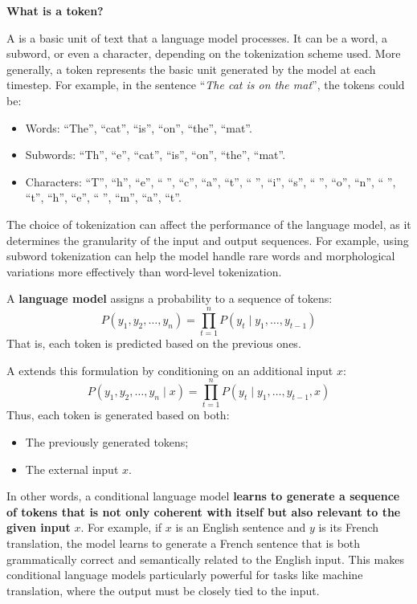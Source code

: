 \begin{flushleft}
    \textcolor{Green3}{ \textbf{What is a token?}}
\end{flushleft}
A  is a basic unit of text that a language model processes. It can be a word, a subword, or even a character, depending on the tokenization scheme used. More generally, a token represents the basic unit generated by the model at each timestep. For example, in the sentence ``\emph{The cat is on the mat}'', the tokens could be:
\begin{itemize}
    \item Words: ``The'', ``cat'', ``is'', ``on'', ``the'', ``mat''.
    \item Subwords: ``Th'', ``e'', ``cat'', ``is'', ``on'', ``the'', ``mat''.
    \item Characters: ``T'', ``h'', ``e'', `` '', ``c'', ``a'', ``t'', `` '', ``i'', ``s'', `` '', ``o'', ``n'', `` '', ``t'', ``h'', ``e'', `` '', ``m'', ``a'', ``t''.
\end{itemize}
The choice of tokenization can affect the performance of the language model, as it determines the granularity of the input and output sequences. For example, using subword tokenization can help the model handle rare words and morphological variations more effectively than word-level tokenization.

\highspace
\begin{definitionbox}
    A \textbf{language model} assigns a probability to a sequence of tokens:
    \begin{equation*}
        P\left(y_1, y_2, \dots, y_n\right)
        =
        \prod_{t=1}^{n}
        P\left(y_t \mid y_1, \dots, y_{t-1}\right)
    \end{equation*}
    That is, each token is predicted based on the previous ones.

    \highspace
    A  extends this formulation by conditioning on an additional input $x$:
    \begin{equation}\label{eq:conditional-language-model}
        P\left(y_1, y_2, \dots, y_n \mid x\right)
        =
        \prod_{t=1}^{n}
        P\left(y_t \mid y_1, \dots, y_{t-1}, x\right)
    \end{equation}
    Thus, each token is generated based on both:
    \begin{itemize}
        \item The previously generated tokens;
        \item The external input $x$.
    \end{itemize}
    In other words, a conditional language model \textbf{learns to generate a sequence of tokens that is not only coherent with itself but also relevant to the given input} $x$. For example, if $x$ is an English sentence and $y$ is its French translation, the model learns to generate a French sentence that is both grammatically correct and semantically related to the English input. This makes conditional language models particularly powerful for tasks like machine translation, where the output must be closely tied to the input.
\end{definitionbox}

